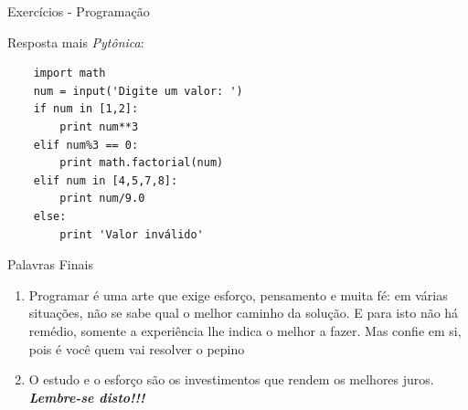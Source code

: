 \documentclass{beamer}
\begin{document}
\begin{frame}[fragile]{Exercícios - Programação}
		\label{exercicio_10_resposta_pytonica}
	
	Resposta mais \textit{Pytônica}:
	
\begin{verbatim}
	import math
	num = input('Digite um valor: ')
	if num in [1,2]:
		print num**3
	elif num%3 == 0:
		print math.factorial(num)
	elif num in [4,5,7,8]:
		print num/9.0
	else:
		print 'Valor inválido'
\end{verbatim}
	
\end{frame}

\begin{frame}{Palavras Finais}
	\label{palavras_finais}
	
	\begin{enumerate}
		\item Programar é uma arte que exige esforço, pensamento e muita fé: em várias situações, não se sabe qual o melhor caminho da solução. E para isto não há remédio, somente a experiência lhe indica o melhor a fazer. Mas confie em si, pois é você quem vai resolver o pepino
		\item O estudo e o esforço são os investimentos que rendem os melhores juros. \alert{\textbf{\textit{Lembre-se disto!!!}}}
	\end{enumerate}
	
\end{frame}


\backmatter
\end{document}
